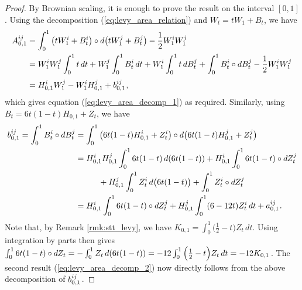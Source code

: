 \documentclass[sn-mathphys-num]{sn-jnl}%
\newcommand{\m}{\hspace{0.25mm}}
\newcommand{\mmm}{\hspace{10mm}}
\begin{document}
\begin{proof}
By Brownian scaling, it is enough to prove the result on the interval $[0,1]$. Using the decomposition (\ref{eq:levy_area_relation}) and $W_t = tW_1 + B_t$, we have
\begin{align*}
A_{0,1}^{ij} & = \int_0^1 \big(tW_1^i + B_t^i\big)\circ d\big(tW_1^j + B_t^j\big) - \frac{1}{2}W_1^i W_1^j\\
& = W_1^i W_1^j\int_0^1 t\, dt +  W_1^j\int_0^1 B_t^i\, dt + W_1^i\int_0^1 t\, dB_t^j + \int_0^1 B_t^i \circ dB_t^j - \frac{1}{2}W_1^i W_1^j \\[3pt]
& = H_{0,1}^i W_1^j - W_1^i H_{0,1}^j + b_{0,1}^{ij}\m,
\end{align*}
which gives equation (\ref{eq:levy_area_decomp_1}) as required. Similarly, using $B_t = 6t(1-t)H_{0,1} + Z_t$, we have
\begin{align*}
b_{0,1}^{ij} = \int_0^1 B_t^i \circ dB_t^j & = \int_0^1 \big(6t(1-t)H_{0,1}^i + Z_t^i\big) \circ d\big(6t(1-t)H_{0,1}^j + Z_t^j\big)\\
& = H_{0,1}^i H_{0,1}^j \int_0^1 6t(1-t)\, d(6t(1-t)) + H_{0,1}^i\int_0^1 6t(1-t) \circ d Z_t^j\\
&\mmm + H_{0,1}^j\int_0^1 Z_t^i\, d\big(6t(1-t)\big) + \int_0^1 Z_t^i \circ dZ_t^j\\
& = H_{0,1}^i\int_0^1 6t(1-t) \circ d Z_t^j +  H_{0,1}^j\int_0^1 (6 - 12t)Z_t^i\, dt + a_{0,1}^{ij}\m.
\end{align*}
Note that, by Remark \ref{rmk:stt_levy}, we have $K_{0,1} = \int_0^1 \big(\frac{1}{2} - t\big)Z_t\, dt$. Using integration by parts then gives
$\int_0^1 6t(1-t) \circ d Z_t  = - \int_0^1 Z_t\, d(6t(1-t)) = -12\int_0^1 \Big(\frac{1}{2} - t\Big)Z_t\, dt = -12K_{0,1}\m$. The second result (\ref{eq:levy_area_decomp_2}) now directly follows from the above decomposition of $b_{0,1}^{ij}\m$.
\end{proof}
\end{document}
